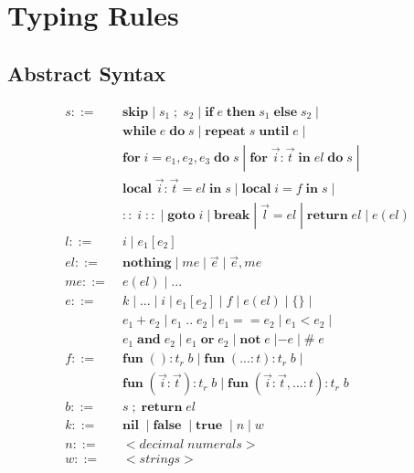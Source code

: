 \documentclass[12pt]{article}
\newcommand{\mylabel}[1]{\; (\textsc{#1})}
\newcommand{\pipe}{|\;}
\newcommand{\kw}[1]{\mathbf{#1} \;}
\begin{document}
%

\section{Typing Rules}

\subsection{Abstract Syntax}

\begin{align*}
s ::= \; & \kw{skip} \pipe s_{1} \;;\; s_{2} \; \pipe
\kw{if} e \; \kw{then} s_{1} \; \kw{else} s_{2} \; \pipe\\
& \kw{while} e \; \kw{do} s \; \pipe
\kw{repeat} s \; \kw{until} e \; \pipe\\
& \kw{for} i=e_{1},e_{2},e_{3} \; \kw{do} s \; \pipe
\kw{for} \vec{i}:\vec{t} \; \kw{in} el \; \kw{do} s \; \pipe\\
& \kw{local} \vec{i}:\vec{t} = el \; \kw{in} s \; \pipe
\kw{local} i = f \; \kw{in} s \; \pipe\\
& \kw{::} i \; \kw{::} \pipe \kw{goto} i \; \pipe \kw{break} \pipe
\vec{l} = el \; \pipe \kw{return} el \; \pipe e(el)\\
l ::= \; & i \; \pipe e_{1}[e_{2}]\\
el ::= \; & \kw{nothing} \pipe me \; \pipe \vec{e} \; \pipe \vec{e},me\\
me ::= \; & e(el) \; \pipe {...}\\
e ::= \; & k \; \pipe {...} \; \pipe i \; \pipe e_{1}[e_{2}] \; \pipe
f \; \pipe e(el) \; \pipe \{\} \; \pipe\\
& e_{1} + e_{2} \; \pipe e_{1} \; {..} \; e_{2} \; \pipe
e_{1} == e_{2} \; \pipe e_{1} < e_{2} \; \pipe\\
& e_{1} \; \kw{and} e_{2} \; \pipe e_{1} \; \kw{or} e_{2} \; \pipe
\kw{not} e \; | - e \; \pipe \# \; e\\
f ::= \; & \kw{fun} ():t_{r} \; b \; \pipe
\kw{fun} ({...}:t):t_{r} \; b \; \pipe\\
& \kw{fun} (\vec{i}:\vec{t}):t_{r} \; b \; \pipe
\kw{fun} (\vec{i}:\vec{t},{...}:t):t_{r} \; b\\
b ::= \; & s \;;\; \kw{return} el\\
k ::= \; & \kw{nil} \; \pipe \kw{false} \; \pipe \kw{true} \; \pipe
n \; \pipe w\\
n ::= \; & {<}decimal\;numerals{>}\\
w ::= \; & {<}strings{>}
\end{align*}
\end{document}
